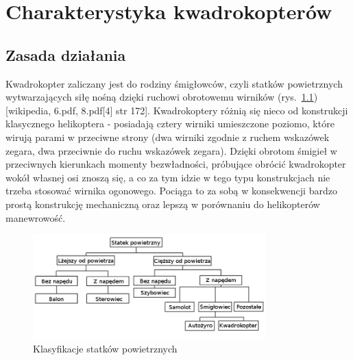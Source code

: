 
\chapter{Charakterystyka kwadrokopterów} %

\label{Chapter2} %



\section{Zasada działania}
Kwadrokopter zaliczany jest do rodziny śmigłowców, czyli statków powietrznych wytwarzających siłę nośną dzięki ruchowi obrotowemu wirników (rys.~\ref{fig:quadrotor_clasification.png})  [wikipedia, 6.pdf, 8.pdf[4] str 172]. Kwadrokoptery różnią się nieco od konstrukcji klasycznego helikoptera - posiadają cztery wirniki umieszczone poziomo, które wirują parami w przeciwne strony (dwa wirniki zgodnie z ruchem wskazówek zegara, dwa przeciwnie do ruchu wskazówek zegara). Dzięki obrotom śmigieł w przeciwnych kierunkach momenty bezwładności, próbujące obrócić kwadrokopter wokół własnej osi znoszą się, a co za tym idzie w tego typu konstrukcjach nie trzeba stosować wirnika ogonowego. Pociąga to za sobą w konsekwencji bardzo prostą konstrukcję mechaniczną oraz lepszą w porównaniu do helikopterów manewrowość. 

\begin{figure}[htbp]
	\centering
		\includegraphics[width=0.8\textwidth]{Pictures/quadrotor_clasification2.png}
		\caption[Klasyfikacja statków powietrznych]{Klasyfikacje statków powietrznych}
		\label{fig:quadrotor_clasification.png}
\end{figure}

